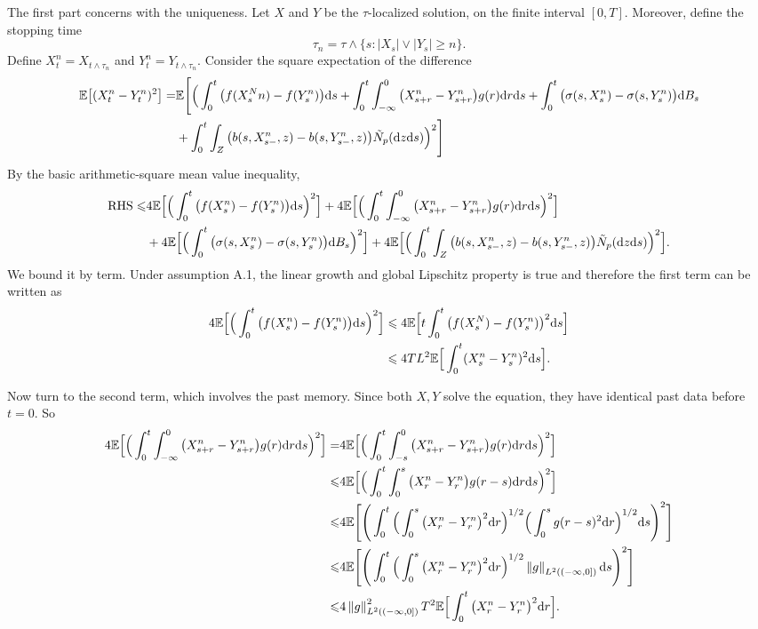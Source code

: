 \documentclass[8pt,onesided]{article}
\begin{document}
The first part concerns with the uniqueness. Let $X$ and $Y$ be the $\tau$-localized solution, on the finite interval $[0,T]$. Moreover, define the stopping time
\begin{equation*}
    \tau_n =\tau \wedge \{s: |X_s|\vee|Y_s|\ge n \}.
\end{equation*}
Define $X^n_t=X_{t\wedge \tau_n}$ and $Y^n_t=Y_{t\wedge \tau_n}$. Consider the square expectation of the difference
\begin{align*}
    \mathbb{E}\big[(X^n_t -Y^n_t)^2\big]=& \mathbb{E}  \Bigg[\Big(
    \int_0^t \big(f(X_s^Nn)-f(Y_s^n)\big)\dd s
    +\int_0^t \int_{-\infty}^0 \big(X_{s+r}^n-Y_{s+r}^n\big) g(r)\dd r \dd s
 +\int_0^t \big(\sigma(s, X^n_s)-\sigma(s, Y_s^n)\big)\dd B_s \\
 &+\int_0^t \int_Z \big(b(s, X^n_{s-},z)-b(s, Y^n_{s-},z)\big)\tilde N_p(\dd z \dd s)\Big)^2\Bigg]
\end{align*}
By the basic arithmetic-square mean value inequality, 
\begin{align*}
    \text{RHS}\leqslant& 4 \mathbb{E} \Big[\Big(\int_0^t \big(f(X_s^n)-f(Y_s^n)\big)\dd s\Big)^2\Big]+4\mathbb{E} \Big[\Big(\int_0^t \int_{-\infty}^0 \big(X_{s+r}^n-Y_{s+r}^n\big) g(r)\dd r \dd s\Big)^2\Big]\\
    &+4\mathbb{E}\Big[\Big(\int_0^t \big(\sigma(s, X^n_s)-\sigma(s, Y_s^n)\big)\dd B_s \Big)^2\Big]+4\mathbb{E}\Big[\Big(\int_0^t \int_Z \big(b(s, X^n_{s-},z)-b(s, Y^n_{s-},z)\big)\tilde N_p(\dd z \dd s)\Big)^2\Big].
\end{align*}
We bound it by term. Under assumption A.1, the linear growth and global Lipschitz property is true and therefore the first term can be written as
\begin{align*}
    4 \mathbb{E} \Big[\Big(\int_0^t \big(f(X_s^n)-f(Y_s^n)\big)\dd s\Big)^2\Big]&\leqslant 4\mathbb{E}\Big[ t\int_0^t\big(f(X_s^N)-f(Y_s^n)\big)^2\dd s \Big]\\
    &\leqslant 4TL^2 \mathbb{E}\Big[ \int_0^t  (X^n_s-Y^n_s)^2\dd s\Big].
\end{align*}

Now turn to the second term, which involves the past memory. Since both $X,Y$ solve the equation, they have identical past data before $t=0$. So
\begin{align*}
    4\mathbb{E} \Big[\Big(\int_0^t \int_{-\infty}^0 \big(X_{s+r}^n-Y_{s+r}^n\big) g(r)\dd r \dd s\Big)^2\Big]
    =&4\mathbb{E} \Big[\Big(\int_0^t \int_{-s}^0 \big(X_{s+r}^n-Y_{s+r}^n\big) g(r)\dd r \dd s\Big)^2\Big]\\
    \leqslant&4\mathbb{E} \Big[\Big(\int_0^t \int_{0}^s \big(X_{r}^n-Y_{r}^n\big) g(r-s)\dd r \dd s\Big)^2\Big]\\
    \leqslant&4\mathbb{E} \Bigg[\Bigg(\int_0^t \Big(\int_{0}^s \big(X_{r}^n-Y_{r}^n\big)^2\dd r\Big)^{1/2}\Big(\int_{0}^s g(r-s)^2\dd r\Big)^{1/2} \dd s\Bigg)^2\Bigg]\\
    \leqslant&4\mathbb{E} \Bigg[\Bigg(\int_0^t \Big(\int_{0}^s \big(X_{r}^n-Y_{r}^n\big)^2\dd r\Big)^{1/2}\left\lVert g\right\rVert_{L^2((-\infty,0])} \dd s\Bigg)^2\Bigg]\\
    \leqslant &4\left\lVert g\right\rVert_{L^2((-\infty,0])}^2  T^2 \mathbb{E}  \Big[\int_0^t \big(X_{r}^n-Y_{r}^n\big)^2 \dd r\Big].
\end{align*}
\end{document}

